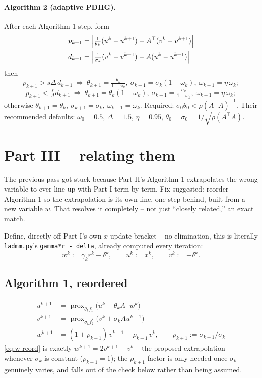 \documentclass[11pt]{article}
\newcommand{\code}[1]{\texttt{#1}}
\newcommand{\prox}{\operatorname{prox}}
\begin{document}
\paragraph{Algorithm 2 (adaptive PDHG).} After each Algorithm-1 step, form
\begin{align}
p_{k+1} &= \Big|\tfrac1{\theta_k}(u^k-u^{k+1}) - A^\top(v^k-v^{k+1})\Big| \notag\\
d_{k+1} &= \Big|\tfrac1{\sigma_k}(v^k-v^{k+1}) - A(u^k-u^{k+1})\Big| \notag
\end{align}
then
\[
p_{k+1}>s\Delta\, d_{k+1}\ \Rightarrow\
\theta_{k+1}=\tfrac{\theta_k}{1-\omega_k},\ \sigma_{k+1}=\sigma_k(1-\omega_k),\ \omega_{k+1}=\eta\,\omega_k;
\]
\[
p_{k+1}<\tfrac{s}{\Delta}d_{k+1}\ \Rightarrow\
\theta_{k+1}=\theta_k(1-\omega_k),\ \sigma_{k+1}=\tfrac{\sigma_k}{1-\omega_k},\ \omega_{k+1}=\eta\,\omega_k;
\]
otherwise $\theta_{k+1}=\theta_k,\ \sigma_{k+1}=\sigma_k,\ \omega_{k+1}=\omega_k$. Required:
$\sigma_0\theta_0<\rho(A^\top A)^{-1}$. Their recommended defaults: $\omega_0=0.5$,
$\Delta=1.5$, $\eta=0.95$, $\theta_0=\sigma_0=1/\sqrt{\rho(A^\top A)}$.

\section*{Part III -- relating them}
The previous pass got stuck because Part II's Algorithm 1 extrapolates the wrong
variable to ever line up with Part I term-by-term. Fix suggested: reorder Algorithm 1
so the extrapolation is its own line, one step behind, built from a new variable $w$.
That resolves it completely -- not just ``closely related,'' an exact match.

Define, directly off Part I's own $x$-update bracket -- no elimination, this is
literally \code{ladmm.py}'s \texttt{gamma*r - delta}, already computed every iteration:
\[
w^k := \gamma_k r^k - \delta^k, \qquad u^k:=x^k,\qquad v^k:=-\delta^k.
\]

\subsection*{Algorithm 1, reordered}
\begin{align}
u^{k+1} &= \prox_{\theta_k f_1}\big(u^k-\theta_k A^\top w^k\big) \label{eq:u-reord}\\
v^{k+1} &= \prox_{\sigma_k f_2^*}\big(v^k+\sigma_k Au^{k+1}\big) \label{eq:v-reord}\\
w^{k+1} &= (1+\rho_{k+1})\,v^{k+1}-\rho_{k+1}\,v^k, \qquad \rho_{k+1}:=\sigma_{k+1}/\sigma_k \label{eq:w-reord}
\end{align}
\eqref{eq:w-reord} is exactly $w^{k+1}=2v^{k+1}-v^k$ -- the proposed extrapolation --
whenever $\sigma_k$ is constant ($\rho_{k+1}=1$); the $\rho_{k+1}$ factor is only needed
once $\sigma_k$ genuinely varies, and falls out of the check below rather than being
assumed.
\end{document}
